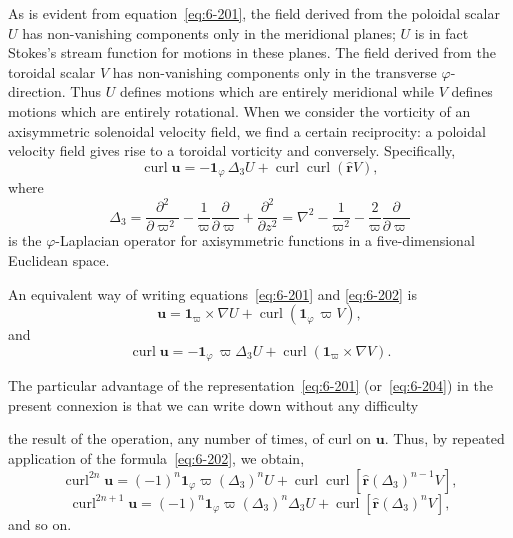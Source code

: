 As is evident from equation~\eqref{eq:6-201}, the field derived from the poloidal
scalar $U$ has non-vanishing components only in the meridional planes;
$U$ is in fact Stokes's stream function for motions in these planes. The
field derived from the toroidal scalar $V$ has non-vanishing components
only in the transverse $\varphi$-direction. Thus $U$ defines motions which are
entirely meridional while $V$ defines motions which are entirely rotational.
When we consider the vorticity of an axisymmetric solenoidal velocity
field, we find a certain reciprocity: a poloidal velocity field gives rise to
a toroidal vorticity and conversely. Specifically,
\begin{equation}\label{eq:6-202}
\operatorname{curl}\boldsymbol{u} = -\mathbf{1}_\varphi\,\Delta_3 U + \operatorname{curl}\operatorname{curl}(\hat{\boldsymbol{r}} V),
\end{equation}
where
\begin{equation}\label{eq:6-203}
\Delta_3 = \frac{\partial^2}{\partial\varpi^2} - \frac{1}{\varpi}\frac{\partial}{\partial\varpi} + \frac{\partial^2}{\partial z^2} = \nabla^2 - \frac{1}{\varpi^2} - \frac{2}{\varpi}\frac{\partial}{\partial\varpi}
\end{equation}
is the $\varphi$-Laplacian operator for axisymmetric functions in a five-dimensional
Euclidean space.

An equivalent way of writing equations~\eqref{eq:6-201} and \eqref{eq:6-202} is
\begin{equation}\label{eq:6-204}
\boldsymbol{u} = \mathbf{1}_\varpi \times \nabla U + \operatorname{curl}(\mathbf{1}_\varphi\,\varpi V),
\end{equation}
and
\begin{equation}\label{eq:6-205}
\operatorname{curl}\boldsymbol{u} = -\mathbf{1}_\varphi\,\varpi\Delta_3 U + \operatorname{curl}(\mathbf{1}_\varpi\times\nabla V).
\end{equation}

The particular advantage of the representation~\eqref{eq:6-201} (or~\eqref{eq:6-204}) in
the present connexion is that we can write down without any difficulty

the result of the operation, any number of times, of curl on $\boldsymbol{u}$. Thus, by
repeated application of the formula~\eqref{eq:6-202}, we obtain,
\begin{equation}\label{eq:6-206}
\operatorname{curl}^{2n}\boldsymbol{u} = (-1)^n\mathbf{1}_\varphi\varpi(\Delta_3)^n U + \operatorname{curl}\operatorname{curl}[\hat{\boldsymbol{r}}(\Delta_3)^{n-1}V],
\end{equation}
\begin{equation}\label{eq:6-207}
\operatorname{curl}^{2n+1}\boldsymbol{u} = (-1)^n\mathbf{1}_\varphi\varpi(\Delta_3)^n\Delta_3 U + \operatorname{curl}[\hat{\boldsymbol{r}}(\Delta_3)^n V],
\end{equation}
and so on.

